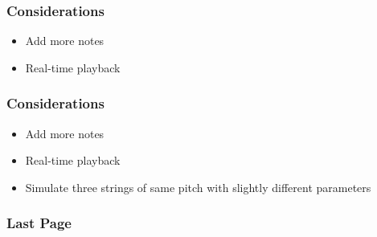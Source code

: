 \documentclass{beamer}
\begin{document}
\begin{frame}\frametitle{Considerations}
\begin{itemize}
\item Add more notes
\item Real-time playback
\end{itemize}
\end{frame}

\begin{frame}\frametitle{Considerations}
\begin{itemize}
\item Add more notes
\item Real-time playback
\item Simulate three strings of same pitch with slightly different parameters
\end{itemize}
\end{frame}


\begin{frame}\frametitle{Last Page}
\end{frame}
\end{document}
